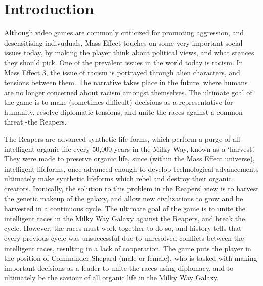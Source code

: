 \documentclass[journal]{IEEEtran}
\begin{document}
\section{Introduction}
Although video games are commonly criticized for promoting aggression, and desensitising indivuduals, Mass Effect touches on some very important %
social issues today, by making the player think about political views,
and what stances they should pick. One of the prevalent issues in the world today is racism. In Mass Effect 3, the issue of racism is portrayed through alien characters, and tensions between them. The narrative takes place in the future, where humans are no longer concerned about racism amongst themselves. The ultimate goal of the game is to make (sometimes difficult) decisions as a representative for humanity, resolve diplomatic tensions, and unite the races against a common threat -the Reapers.

The Reapers are advanced synthetic life forms, which perform a purge of all intelligent organic life every 50,000 years in the Milky Way,
known as a `harvest'. They were made to preserve organic life, since
(within the Mass Effect universe), intelligent lifeforms, once advanced
enough to develop technological advancements ultimately make synthetic
lifeforms which rebel and destroy their organic creators. Ironically,
the solution to this problem in the Reapers' view is to harvest the genetic makeup of the galaxy, and allow new civilizations to grow and be harvested in a continuous cycle. The ultimate goal of the game is to unite the intelligent
races in the Milky Way Galaxy against the Reapers, and break the cycle.
However, the races must work together to do so,
and history tells that every previous cycle was
unsuccessful due to unresolved conflicts between the intelligent races, resulting in a lack of cooperation. The game puts the player in the position of Commander Shepard (male or female), who is tasked with making important decisions as a leader to unite the races using diplomacy, and to ultimately be the saviour of all organic life in the Milky Way Galaxy.
\end{document}
